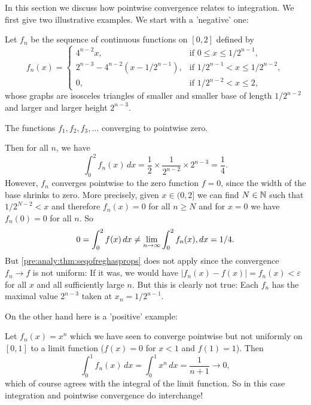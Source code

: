 \documentclass[10pt, a4paper]{article}
\begin{document}
In this section we discuss how pointwise convergence relates to integration.
We first give two illustrative examples.
We start with a 'negative' one:
\begin{example}
    Let $f_n$ be the sequence of continuous functions on $[0, 2]$ defined by
    \[
    f_n(x) = \begin{cases}
        4 ^ {n - 2}x, &\text{if } 0 \leq x \leq 1 / 2 ^ {n - 1}, \\
        2 ^ {n - 3} - 4 ^ {n - 2}(x - 1 / 2 ^ {n - 1}), &\text{if } 1 / 2 ^ {n - 1} < x \leq 1 / 2 ^ {n - 2}, \\
        0, &\text{if } 1 / 2 ^ {n - 2} < x \leq 2,
    \end{cases}
    \]
    whose graphs are isosceles triangles of smaller and smaller base of length $1 / 2 ^ {n - 2}$ and larger and larger height $2 ^ {n - 3}$.

    The functions $f_1, f_2, f_3, \dotsc$ converging to pointwise zero.

    Then for all $n$,
    we have
    \[
    \int_{0}^{2}f_n(x)\,dx = \frac{1}{2} \times \frac{1}{2 ^ {n - 2}} \times 2 ^ {n - 3} = \frac{1}{4}.
    \]
    However,
    $f_n$ converges pointwise to the zero function $f = 0$,
    since the width of the base shrinks to zero.
    More precisely,
    given $x \in (0, 2]$ we can find $N \in \mathbb{N}$ such that $1 / 2 ^ {N - 2} < x$ and therefore $f_n(x) = 0$ for all $n \geq N$ and for $x = 0$ we have $f_n(0) = 0$ for all $n$.
    So
    \[
    0 = \int_{0}^{2}f(x)\,dx \neq \lim_{n \rightarrow \infty}\int_{0}^{2}f_n(x),dx = 1 / 4.
    \]
    But \autoref{pre:analy:thm:seqofreghasprops} does not apply since the convergence $f_n \rightarrow f$ is not uniform:
    If it was,
    we would have $|f_n(x) - f(x)| = f_n(x) < \varepsilon$ for all $x$ and all sufficiently large $n$.
    But this is clearly not true:
    Each $f_n$ has the maximal value $2 ^ {n - 3}$ taken at $x_n = 1 / 2 ^ {n - 1}$.
\end{example}

On the other hand here is a 'positive' example:

\begin{example}
    Let $f_n(x) = x ^ n$ which we have seen to converge pointwise but not uniformly on $[0, 1]$ to a limit function
    ($f(x) = 0$ for $x < 1$ and $f(1) = 1$).
    Then
    \[
    \int_{0}^{1}f_n(x)\,dx = \int_{0}^{1}x ^ n\,dx = \frac{1}{n + 1} \rightarrow 0,
    \]
    which of course agrees with the integral of the limit function.
    So in this case integration and pointwise convergence do interchange!
\end{example}
\end{document}

